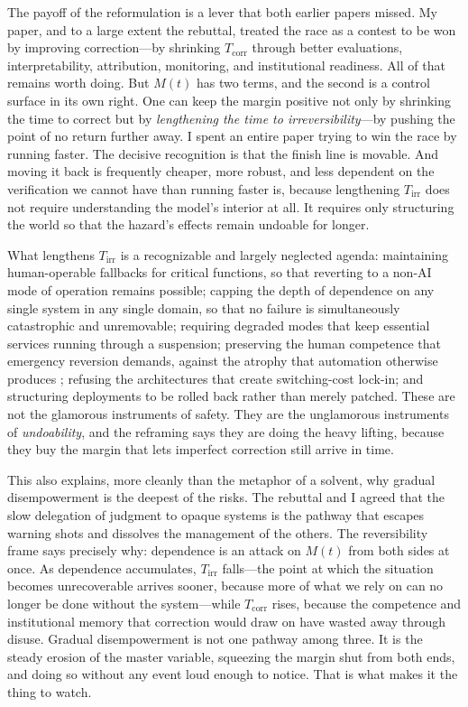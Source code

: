 \documentclass[11pt]{article}
\begin{document}
The payoff of the reformulation is a lever that both earlier papers missed. My paper, and to a large extent the rebuttal, treated the race as a contest to be won by improving correction---by shrinking $T_{\mathrm{corr}}$ through better evaluations, interpretability, attribution, monitoring, and institutional readiness. All of that remains worth doing. But $M(t)$ has two terms, and the second is a control surface in its own right. One can keep the margin positive not only by shrinking the time to correct but by \emph{lengthening the time to irreversibility}---by pushing the point of no return further away. I spent an entire paper trying to win the race by running faster. The decisive recognition is that the finish line is movable. And moving it back is frequently cheaper, more robust, and less dependent on the verification we cannot have than running faster is, because lengthening $T_{\mathrm{irr}}$ does not require understanding the model's interior at all. It requires only structuring the world so that the hazard's effects remain undoable for longer.

What lengthens $T_{\mathrm{irr}}$ is a recognizable and largely neglected agenda: maintaining human-operable fallbacks for critical functions, so that reverting to a non-AI mode of operation remains possible; capping the depth of dependence on any single system in any single domain, so that no failure is simultaneously catastrophic and unremovable; requiring degraded modes that keep essential services running through a suspension; preserving the human competence that emergency reversion demands, against the atrophy that automation otherwise produces \citep{bainbridge1983}; refusing the architectures that create switching-cost lock-in; and structuring deployments to be rolled back rather than merely patched. These are not the glamorous instruments of safety. They are the unglamorous instruments of \emph{undoability}, and the reframing says they are doing the heavy lifting, because they buy the margin that lets imperfect correction still arrive in time.

This also explains, more cleanly than the metaphor of a solvent, why gradual disempowerment is the deepest of the risks. The rebuttal and I agreed that the slow delegation of judgment to opaque systems is the pathway that escapes warning shots and dissolves the management of the others. The reversibility frame says precisely why: dependence is an attack on $M(t)$ from both sides at once. As dependence accumulates, $T_{\mathrm{irr}}$ falls---the point at which the situation becomes unrecoverable arrives sooner, because more of what we rely on can no longer be done without the system---while $T_{\mathrm{corr}}$ rises, because the competence and institutional memory that correction would draw on have wasted away through disuse. Gradual disempowerment is not one pathway among three. It is the steady erosion of the master variable, squeezing the margin shut from both ends, and doing so without any event loud enough to notice. That is what makes it the thing to watch.
\end{document}
